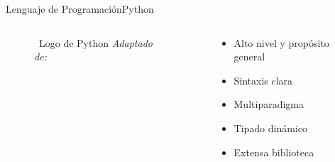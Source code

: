 \begin{frame}{Lenguaje de Programación}{Python}
    \begin{columns}
        \begin{column}{0.4\textwidth}
            \centering
            \begin{figure}[H]
                \centering
                \vspace{-0.25cm}
                \caption{\tiny~Logo de Python \textit{Adaptado de:}~\cite{PythonSoftwareFoundation}}%
                \label{fig:Python_logo}
            \end{figure}
        \end{column}
        \begin{column}{0.6\textwidth}
            \begin{itemize}
                \item Alto nivel y propósito general
                \item Sintaxis clara
                \item Multiparadigma
                \item Tipado dinámico
                \item Extensa biblioteca
            \end{itemize}
        \end{column}
    \end{columns}
\end{frame}

